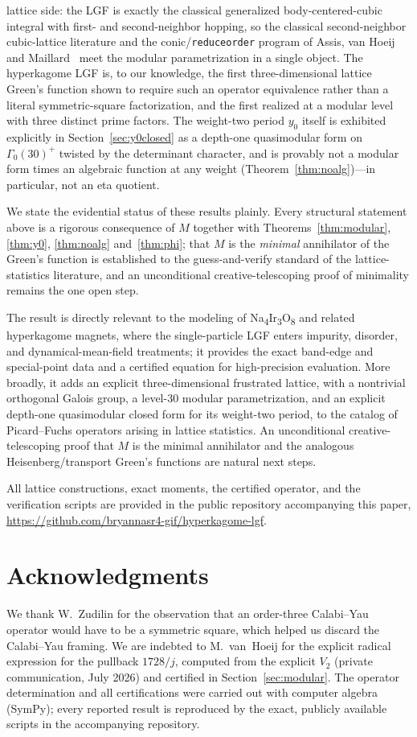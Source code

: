 \documentclass[cntp]{ipart}
\theoremstyle{plain}
\theoremstyle{remark}
\begin{document}
lattice side: the LGF is exactly the classical generalized body-centered-cubic integral with first- and
second-neighbor hopping, so the classical second-neighbor cubic-lattice literature and the
conic/\texttt{reduceorder} program of Assis, van Hoeij and Maillard~\cite{AVM2016} meet the modular
parametrization in a single object. The hyperkagome LGF is, to our knowledge, the first three-dimensional
lattice Green's function shown to require such an operator equivalence rather than a literal symmetric-square
factorization, and the first realized at a modular level with three distinct prime factors. The weight-two
period $y_0$ itself is exhibited explicitly in Section~\ref{sec:y0closed} as a depth-one quasimodular form on
$\Gamma_0(30)^+$ twisted by the determinant character, and is provably not a modular form times an algebraic
function at any weight (Theorem~\ref{thm:noalg})---in particular, not an eta quotient.

We state the evidential status of these results plainly. Every structural statement above is a rigorous
consequence of $M$ together with Theorems~\ref{thm:modular}, \ref{thm:y0}, \ref{thm:noalg}
and~\ref{thm:phi}; that $M$ is the \emph{minimal} annihilator of the Green's function is established to the
guess-and-verify standard of the lattice-statistics literature, and an unconditional creative-telescoping
proof of minimality remains the one open step.

The result is directly relevant to the modeling of Na\textsubscript{4}Ir\textsubscript{3}O\textsubscript{8} and related hyperkagome magnets, where the
single-particle LGF enters impurity, disorder, and dynamical-mean-field treatments; it provides the exact
band-edge and special-point data and a certified equation for high-precision evaluation. More broadly, it adds an
explicit three-dimensional frustrated lattice, with a nontrivial orthogonal Galois group, a level-30 modular
parametrization, and an explicit depth-one quasimodular closed form for its weight-two period, to the catalog
of Picard--Fuchs operators arising in lattice statistics. An unconditional creative-telescoping proof that $M$
is the minimal annihilator and the analogous Heisenberg/transport Green's functions are natural next steps.

All lattice constructions, exact moments, the certified operator, and the verification scripts are provided in
the public repository accompanying this paper,
\url{https://github.com/bryannasr4-gif/hyperkagome-lgf}.

\section*{Acknowledgments}
We thank W.~Zudilin for the observation that an order-three
Calabi--Yau operator would have to be a symmetric square, which helped us discard the Calabi--Yau framing.
We are indebted to M.~van~Hoeij for the explicit radical expression for the pullback $1728/j$, computed from
the explicit $V_2$ (private communication, July 2026) and certified in Section~\ref{sec:modular}.
The operator determination and all certifications were carried out with computer algebra (SymPy); every reported
result is reproduced by the exact, publicly available scripts in the accompanying repository.
\end{document}

